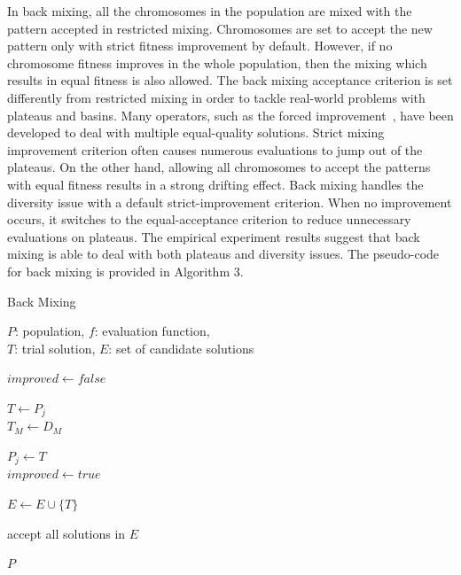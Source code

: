 \documentclass{sig-alternate-05-2015}
\begin{document}
In back mixing, all the chromosomes in the population are mixed with the pattern accepted in restricted mixing. Chromosomes are set to accept the new pattern only with strict fitness improvement by default. However, if no chromosome fitness improves in the whole population, then the mixing which results in equal fitness is also allowed. The back mixing acceptance criterion is set differently from restricted mixing in order to tackle real-world problems with plateaus and basins. Many operators, such as the forced improvement~\cite{bosman:LT-GOMEA}, have been developed to deal with multiple equal-quality solutions. Strict mixing improvement criterion often causes numerous evaluations to jump out of the plateaus. On the other hand, allowing all chromosomes to accept the patterns with equal fitness results in a strong drifting effect. Back mixing handles the diversity issue with a default strict-improvement criterion. When no improvement occurs, it switches to the equal-acceptance criterion to reduce unnecessary evaluations on plateaus. The empirical experiment results suggest that back mixing is able to deal with both plateaus and diversity issues. The pseudo-code for back mixing is provided in Algorithm 3. 

\begin{algorithm}
\caption{Back Mixing}\label{algo_disjdecomp}

$P$: population, $f$: evaluation function, \\
$T$: trial solution, $E$: set of candidate solutions 


\BlankLine

$improved  \leftarrow false$ \\
 {

    $T \leftarrow P_j$ \\
    $T_M \leftarrow D_M$ \\

     {

        $P_j \leftarrow T$ \\
        $improved  \leftarrow true$ \\
    }{
         {
            $E \leftarrow E \cup \{T\}$ \\
        }
    }
}
 {
    accept all solutions in $E$ \\
} 

\Return $P$

\end{algorithm} 
\end{document}

